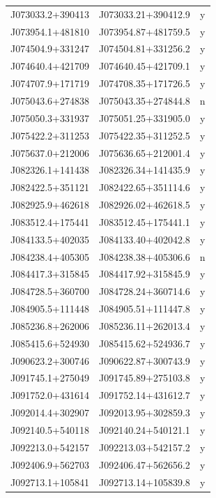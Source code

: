 \begin{table}
\begin{tabular}{ccc}
        J073033.2+390413 & J073033.21+390412.9 & y\\
        J073954.1+481810 & J073954.87+481759.5 & y\\
        J074504.9+331247 & J074504.81+331256.2 & y\\
        J074640.4+421709 & J074640.45+421709.1 & y\\
        J074707.9+171719 & J074708.35+171726.5 & y\\
        J075043.6+274838 & J075043.35+274844.8 & n\\
        J075050.3+331937 & J075051.25+331905.0 & y\\
        J075422.2+311253 & J075422.35+311252.5 & y\\
        J075637.0+212006 & J075636.65+212001.4 & y\\
        J082326.1+141438 & J082326.34+141435.9 & y\\
        J082422.5+351121 & J082422.65+351114.6 & y\\
        J082925.9+462618 & J082926.02+462618.5 & y\\
        J083512.4+175441 & J083512.45+175441.1 & y\\
        J084133.5+402035 & J084133.40+402042.8 & y\\
        J084238.4+405305 & J084238.38+405306.6 & n\\
        J084417.3+315845 & J084417.92+315845.9 & y\\
        J084728.5+360700 & J084728.24+360714.6 & y\\
        J084905.5+111448 & J084905.51+111447.8 & y\\
        J085236.8+262006 & J085236.11+262013.4 & y\\
        J085415.6+524930 & J085415.62+524936.7 & y\\
        J090623.2+300746 & J090622.87+300743.9 & y\\
        J091745.1+275049 & J091745.89+275103.8 & y\\
        J091752.0+431614 & J091752.14+431612.7 & y\\
        J092014.4+302907 & J092013.95+302859.3 & y\\
        J092140.5+540118 & J092140.24+540121.1 & y\\
        J092213.0+542157 & J092213.03+542157.2 & y\\
        J092406.9+562703 & J092406.47+562656.2 & y\\
        J092713.1+105841 & J092713.14+105839.8 & y\\

\end{tabular}
\end{table}
